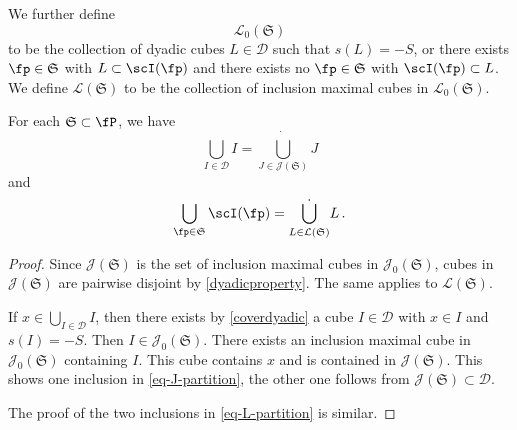 We further define
$$
    \mathcal{L}_0(\mathfrak{S})
$$
to be the collection of dyadic cubes $L \in \mathcal{D}$ such that $s(L) = -S$, or there exists $\fp \in \mathfrak{S}$ with $L \subset \scI(\fp)$ and there exists no $\fp \in \mathfrak{S}$ with $\scI(\fp) \subset L$. We define $\mathcal{L}(\mathfrak{S})$ to be the collection of inclusion maximal cubes in $\mathcal{L}_0(\mathfrak{S})$.

\begin{lemma}
    \label{dyadic-partitions}
    For each $\mathfrak{S} \subset \fP$, we have
    \begin{equation}
        \label{eq-J-partition}
        \bigcup_{I \in \mathcal{D}} I = \dot{\bigcup_{J \in \mathcal{J}(\mathfrak{S})}} J
    \end{equation}
    and
    \begin{equation}
        \label{eq-L-partition}
        \bigcup_{\fp\in \mathfrak{S}} \scI(\fp) = \dot{\bigcup_{L \in \mathcal{L}(\mathfrak{S})}} L\,.
    \end{equation}
\end{lemma}

\begin{proof}
    Since $\mathcal{J}(\mathfrak{S})$ is the set of inclusion maximal cubes in $\mathcal{J}_0(\mathfrak{S})$, cubes in $\mathcal{J}(\mathfrak{S})$ are pairwise disjoint by \eqref{dyadicproperty}. The same applies to $\mathcal{L}(\mathfrak{S})$.

    If $x \in \bigcup_{I \in \mathcal{D}} I$, then there exists by \eqref{coverdyadic} a cube $I \in \mathcal{D}$ with $x \in I$ and $s(I) = -S$. Then $I \in \mathcal{J}_0(\mathfrak{S})$. There exists an inclusion maximal cube in $\mathcal{J}_0(\mathfrak{S})$ containing $I$. This cube contains $x$ and is contained in $\mathcal{J}(\mathfrak{S})$. This shows one inclusion in \eqref{eq-J-partition}, the other one follows from $\mathcal{J}(\mathfrak{S}) \subset \mathcal{D}$.

    The proof of the two inclusions in \eqref{eq-L-partition} is similar.
\end{proof}


